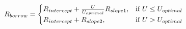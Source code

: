 \documentclass[preview]{standalone}
\begin{document}
\begin{align*}
R_{borrow} = \begin{cases} R_{intercept} + \frac{ U }{ U _{optimal}}R_{slope1}, & \text{if }  U  \leq  U _{optimal} \cr R_{intercept} + R_{slope2}, & \text{if }  U  >  U _{optimal} \end{cases}
\end{align*}
\end{document}
